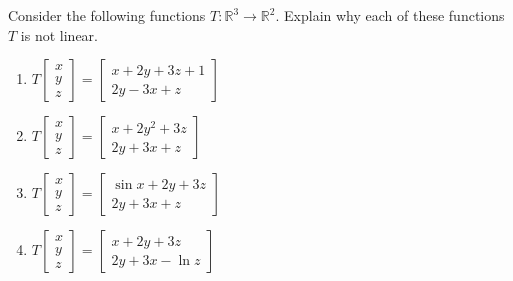 \documentclass{ximera}
\begin{document}
\begin{problem}\label{prb:10.69} Consider the following functions $T:\mathbb{R}^{3}\rightarrow \mathbb{R}^{2}.$
Explain why each of these functions $T$ is not linear.

\begin{enumerate}
\item $T\left[
\begin{array}{c}
x \\
y \\
z
\end{array}
\right] =\left[
\begin{array}{c}
x+2y+3z+1 \\
2y-3x+z
\end{array}
\right] $

\item $T\left[
\begin{array}{c}
x \\
y \\
z
\end{array}
\right] =\left[
\begin{array}{c}
x+2y^{2}+3z \\
2y+3x+z
\end{array}
\right] $

\item $T\left[
\begin{array}{c}
x \\
y \\
z
\end{array}
\right] =\left[
\begin{array}{c}
\sin x+2y+3z \\
2y+3x+z
\end{array}
\right] $

\item $T\left[
\begin{array}{c}
x \\
y \\
z
\end{array}
\right] =\left[
\begin{array}{c}
x+2y+3z \\
2y+3x-\ln z
\end{array}
\right] $
\end{enumerate}
\end{problem}
\end{document}
